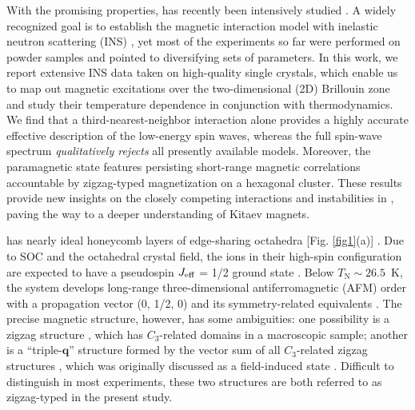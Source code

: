 \documentclass[%
reprint,
superscriptaddress,
amsmath,amssymb,
aps,
prb,
]{revtex4-2}
\begin{document}
With the promising properties,  has recently been intensively studied \cite{YaoPRB2020,SongvilayPRB2020,XPRB2021,LinNC2021,SamarakoonPRB2021,KimJPCM2021,SandersArxiv2021}. A widely recognized goal is to establish the magnetic interaction model with inelastic neutron scattering (INS) \cite{SongvilayPRB2020,LinNC2021,SamarakoonPRB2021,KimJPCM2021,SandersArxiv2021}, yet most of the experiments so far were performed on powder samples and pointed to diversifying sets of parameters. In this work, we report extensive INS data taken on high-quality single crystals, which enable us to map out magnetic excitations over the two-dimensional (2D) Brillouin zone and study their temperature dependence in conjunction with thermodynamics. We find that a third-nearest-neighbor interaction alone provides a highly accurate effective description of the low-energy spin waves, whereas the full spin-wave spectrum \textit{qualitatively rejects} all presently available models. Moreover, the paramagnetic state features persisting short-range magnetic correlations accountable by zigzag-typed magnetization on a hexagonal cluster. These results provide new insights on the closely competing interactions and instabilities in , paving the way to a deeper understanding of Kitaev magnets.
	
 has nearly ideal honeycomb layers of edge-sharing  octahedra [Fig. \ref{fig1}(a)] \cite{ViciuJSSC2007,LefrancoisPRB2016,BeraPRB2017,XiaoCGD2019}. Due to SOC and the octahedral crystal field, the  ions in their high-spin configuration are expected to have a pseudospin $J_{\rm{eff}}$ = 1/2 ground state \cite{LiuPRB2018,SanoPRB2018}. Below $T_\mathrm{N}\sim26.5$~K, the system develops long-range three-dimensional antiferromagnetic (AFM) order with a propagation vector (0, 1/2, 0) and its symmetry-related equivalents \cite{BeraPRB2017,XiaoCGD2019,SamarakoonPRB2021}. The precise magnetic structure, however, has some ambiguities: one possibility is a zigzag structure \cite{LefrancoisPRB2016,BeraPRB2017,SamarakoonPRB2021}, which has $C_3$-related domains in a macroscopic sample; another is a ``triple-$\mathbf{q}$'' structure formed by the vector sum of all $C_3$-related zigzag structures \cite{XPRB2021}, which was originally discussed as a field-induced state \cite{JanssenPRL2016}. Difficult to distinguish in most experiments, these two structures are both referred to as zigzag-typed in the present study.
\end{document}
